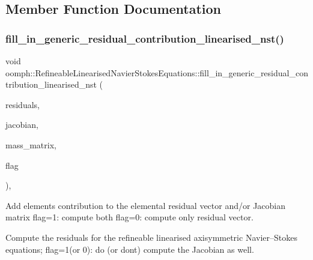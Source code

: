 \subsection{Member Function Documentation}
\mbox{\label{classoomph_1_1RefineableLinearisedNavierStokesEquations_afb1a09529a1655020ff037c37f00b201}} 
\subsubsection{\texorpdfstring{fill\+\_\+in\+\_\+generic\+\_\+residual\+\_\+contribution\+\_\+linearised\+\_\+nst()}{fill\_in\_generic\_residual\_contribution\_linearised\_nst()}}
{\footnotesize\ttfamily void oomph\+::\+Refineable\+Linearised\+Navier\+Stokes\+Equations\+::fill\+\_\+in\+\_\+generic\+\_\+residual\+\_\+contribution\+\_\+linearised\+\_\+nst (\begin{DoxyParamCaption}\item[{\hyperlink{classoomph_1_1Vector}{Vector}$<$ double $>$ \&}]{residuals,  }\item[{\hyperlink{classoomph_1_1DenseMatrix}{Dense\+Matrix}$<$ double $>$ \&}]{jacobian,  }\item[{\hyperlink{classoomph_1_1DenseMatrix}{Dense\+Matrix}$<$ double $>$ \&}]{mass\+\_\+matrix,  }\item[{unsigned}]{flag }\end{DoxyParamCaption})\hspace{0.3cm}{\ttfamily [private]}, {\ttfamily [virtual]}}



Add element\textquotesingle{}s contribution to the elemental residual vector and/or Jacobian matrix flag=1\+: compute both flag=0\+: compute only residual vector. 

Compute the residuals for the refineable linearised axisymmetric Navier--Stokes equations; flag=1(or 0)\+: do (or don\textquotesingle{}t) compute the Jacobian as well. 

